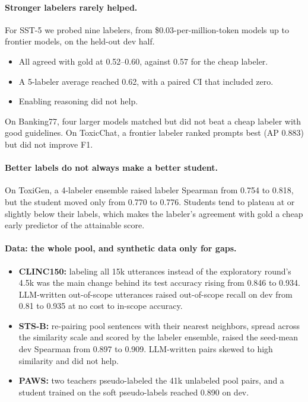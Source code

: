 \documentclass[11pt]{article}
\begin{document}
\paragraph{Stronger labelers rarely helped.}
For SST-5 we probed nine labelers, from \$0.03-per-million-token models up to frontier models, on the held-out dev half.
\begin{itemize}
  \item All agreed with gold at 0.52--0.60, against 0.57 for the cheap labeler.
  \item A 5-labeler average reached 0.62, with a paired CI that included zero.
  \item Enabling reasoning did not help.
\end{itemize}
On Banking77, four larger models matched but did not beat a cheap labeler with good guidelines. On ToxicChat, a frontier labeler ranked prompts best (AP 0.883) but did not improve F1.

\paragraph{Better labels do not always make a better student.}
On ToxiGen, a 4-labeler ensemble raised labeler Spearman from 0.754 to 0.818, but the student moved only from 0.770 to 0.776.
Students tend to plateau at or slightly below their labels, which makes the labeler's agreement with gold a cheap early predictor of the attainable score.

\paragraph{Data: the whole pool, and synthetic data only for gaps.}
\begin{itemize}
  \item \textbf{CLINC150:} labeling all 15k utterances instead of the exploratory round's 4.5k was the main change behind its test accuracy rising from 0.846 to 0.934. LLM-written out-of-scope utterances raised out-of-scope recall on dev from 0.81 to 0.935 at no cost to in-scope accuracy.
  \item \textbf{STS-B:} re-pairing pool sentences with their nearest neighbors, spread across the similarity scale and scored by the labeler ensemble, raised the seed-mean dev Spearman from 0.897 to 0.909. LLM-written pairs skewed to high similarity and did not help.
  \item \textbf{PAWS:} two teachers pseudo-labeled the 41k unlabeled pool pairs, and a student trained on the soft pseudo-labels reached 0.890 on dev.
\end{itemize}
\end{document}
